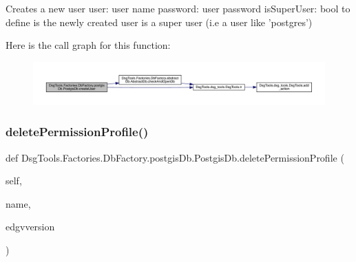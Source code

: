 \begin{DoxyVerb}Creates a new user
user: user name
password: user password
isSuperUser: bool to define is the newly created user is a super user (i.e a user like 'postgres')
\end{DoxyVerb}
 Here is the call graph for this function\+:
\nopagebreak
\begin{figure}[H]
\begin{center}
\leavevmode
\includegraphics[width=350pt]{class_dsg_tools_1_1_factories_1_1_db_factory_1_1postgis_db_1_1_postgis_db_ae9c136c6ecbd705706f3f583e4a3cce5_cgraph}
\end{center}
\end{figure}
\mbox{\label{class_dsg_tools_1_1_factories_1_1_db_factory_1_1postgis_db_1_1_postgis_db_a8c073034c419bd5513170aceb8d96570}} 
\subsubsection{\texorpdfstring{delete\+Permission\+Profile()}{deletePermissionProfile()}}
{\footnotesize\ttfamily def Dsg\+Tools.\+Factories.\+Db\+Factory.\+postgis\+Db.\+Postgis\+Db.\+delete\+Permission\+Profile (\begin{DoxyParamCaption}\item[{}]{self,  }\item[{}]{name,  }\item[{}]{edgvversion }\end{DoxyParamCaption})}


